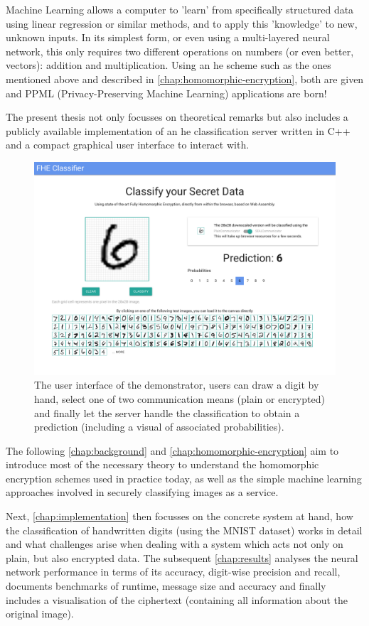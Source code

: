 Machine Learning allows a computer to 'learn' from specifically structured data using linear regression or similar methods, and to apply this 'knowledge' to new, unknown inputs.
In its simplest form, or even using a multi-layered neural network, this only requires two different operations on numbers (or even better, vectors): addition and multiplication.
Using an \gls{he} scheme such as the ones mentioned above and described in \autoref{chap:homomorphic-encryption}, both are given and PPML (Privacy-Preserving Machine Learning) applications are born!

The present thesis not only focusses on theoretical remarks but also includes a publicly available implementation of an \gls{he} classification server written in C++ and a compact graphical user interface to interact with.

\begin{figure}[H]
  \centering
  \label{fig:frontend}
  \includegraphics[width=\linewidth]{figures/frontend.pdf}
  \vspace{-1.2cm}
  \caption{The user interface of the demonstrator, users can draw a digit by hand, select one of two communication means (plain or encrypted) and finally let the server handle the classification to obtain a prediction (including a visual of associated probabilities).}
\end{figure}

The following \autoref{chap:background} and \autoref{chap:homomorphic-encryption} aim to introduce most of the necessary theory to understand the homomorphic encryption schemes used in practice today, as well as the simple machine learning approaches involved in securely classifying images as a service.

Next, \autoref{chap:implementation} then focusses on the concrete system at hand, how the classification of handwritten digits (using the MNIST dataset) works in detail and what challenges arise when dealing with a system which acts not only on plain, but also encrypted data.
The subsequent \autoref{chap:results} analyses the neural network performance in terms of its accuracy, digit-wise precision and recall, documents benchmarks of runtime, message size and accuracy and finally includes a visualisation of the ciphertext (containing all information about the original image).
